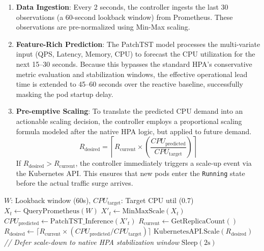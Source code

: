 \documentclass[conference]{IEEEtran}
\begin{document}
\begin{enumerate}
    \item \textbf{Data Ingestion}: Every 2 seconds, the controller ingests the last 30 observations (a 60-second lookback window) from Prometheus. These observations are pre-normalized using Min-Max scaling.
    \item \textbf{Feature-Rich Prediction}: The PatchTST model processes the multi-variate input (QPS, Latency, Memory, CPU) to forecast the CPU utilization for the next 15--30 seconds. Because this bypasses the standard HPA's conservative metric evaluation and stabilization windows, the effective operational lead time is extended to 45--60 seconds over the reactive baseline, successfully masking the pod startup delay.
    \item \textbf{Pre-emptive Scaling}: To translate the predicted CPU demand into an actionable scaling decision, the controller employs a proportional scaling formula modeled after the native HPA logic, but applied to future demand.
    \begin{equation}
    \label{eq:scaling}
    R_{\text{desired}}
    =
    \left\lceil
    R_{\text{current}}
    \times
    \left(
    \frac{CPU_{\text{predicted}}}
    {CPU_{\text{target}}}
    \right)
    \right\rceil
    \end{equation}
    \noindent If $R_{\text{desired}} > R_{\text{current}}$, the controller immediately triggers a scale-up event via the Kubernetes API. This ensures that new pods enter the \texttt{Running} state before the actual traffic surge arrives.
\end{enumerate}

\begin{algorithm}[H]
\caption{Proactive PatchTST Autoscaling Loop}
\label{alg:scaling}
\begin{algorithmic}[1]
\REQUIRE $W$: Lookback window (60s), $CPU_{\text{target}}$: Target CPU util (0.7)
\LOOP
    \STATE $X_{t} \leftarrow \text{QueryPrometheus}(W)$
    \STATE $X'_{t} \leftarrow \text{MinMaxScale}(X_{t})$
    \STATE $CPU_{\text{predicted}} \leftarrow \text{PatchTST\_Inference}(X'_{t})$
        \STATE $R_{\text{current}} \leftarrow \text{GetReplicaCount}()$
        \STATE $R_{\text{desired}} \leftarrow \lceil R_{\text{current}} \times (CPU_{\text{predicted}} / CPU_{\text{target}}) \rceil$
            \STATE $\text{KubernetesAPI.Scale}(R_{\text{desired}})$
        \ELSE
            \STATE \textit{// Defer scale-down to native HPA stabilization window}
        \ENDIF
    \ENDIF
    \STATE $\text{Sleep}(2\text{s})$
\ENDLOOP
\end{algorithmic}
\end{algorithm}
\end{document}
